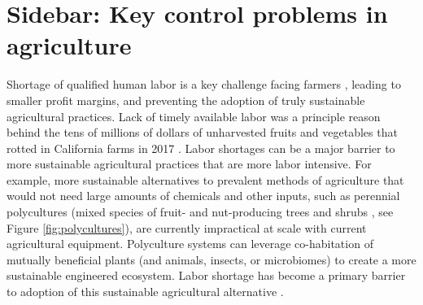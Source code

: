 \section[How can control engineers help agriculture?]{Sidebar: Key control problems in agriculture}\label{sb:ag}


Shortage of qualified human labor is a key challenge facing farmers \cite{richards2018immigration,hertz2013there}, leading to smaller profit margins, and preventing the adoption of truly sustainable agricultural practices. Lack of timely available labor was a principle reason behind the tens of millions of dollars of unharvested fruits and vegetables that rotted in California farms in 2017 \cite{guthman2017paradoxes,RN4026}.  Labor shortages can be a major barrier to more sustainable agricultural practices that are more labor intensive.
For example, more sustainable alternatives to prevalent methods of agriculture that would not need large amounts of chemicals and other inputs, such as perennial polycultures (mixed species of fruit- and nut-producing trees and shrubs \cite{lovell2017temperate}, see Figure \ref{fig:polycultures}), are currently impractical at scale with current agricultural equipment. Polyculture systems can leverage co-habitation of mutually beneficial plants (and animals, insects, or microbiomes) to create a more sustainable engineered ecosystem. Labor shortage has become a primary barrier to adoption of this sustainable agricultural alternative \cite{RN4017,RN4018}.  %

